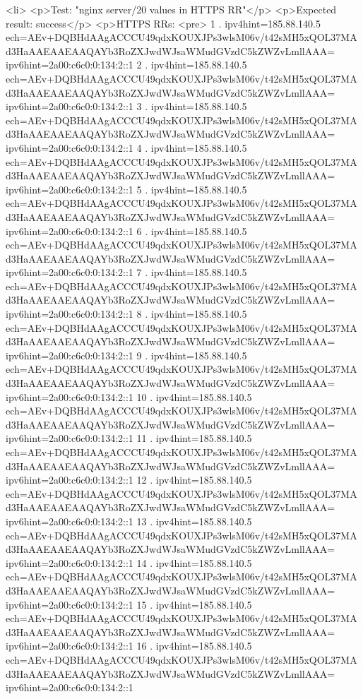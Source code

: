 <li>
<p>Test: "nginx server/20 values in HTTPS RR"</p>
<p>Expected result: success</p>
<p>HTTPS RRs: <pre>
1 . ipv4hint=185.88.140.5 ech=AEv+DQBHdAAgACCCU49qdxKOUXJPs3wlsM06v/t42sMH5xQOL37MAd3HaAAEAAEAAQAYb3RoZXJwdWJsaWMudGVzdC5kZWZvLmllAAA= ipv6hint=2a00:c6c0:0:134:2::1
2 . ipv4hint=185.88.140.5 ech=AEv+DQBHdAAgACCCU49qdxKOUXJPs3wlsM06v/t42sMH5xQOL37MAd3HaAAEAAEAAQAYb3RoZXJwdWJsaWMudGVzdC5kZWZvLmllAAA= ipv6hint=2a00:c6c0:0:134:2::1
3 . ipv4hint=185.88.140.5 ech=AEv+DQBHdAAgACCCU49qdxKOUXJPs3wlsM06v/t42sMH5xQOL37MAd3HaAAEAAEAAQAYb3RoZXJwdWJsaWMudGVzdC5kZWZvLmllAAA= ipv6hint=2a00:c6c0:0:134:2::1
4 . ipv4hint=185.88.140.5 ech=AEv+DQBHdAAgACCCU49qdxKOUXJPs3wlsM06v/t42sMH5xQOL37MAd3HaAAEAAEAAQAYb3RoZXJwdWJsaWMudGVzdC5kZWZvLmllAAA= ipv6hint=2a00:c6c0:0:134:2::1
5 . ipv4hint=185.88.140.5 ech=AEv+DQBHdAAgACCCU49qdxKOUXJPs3wlsM06v/t42sMH5xQOL37MAd3HaAAEAAEAAQAYb3RoZXJwdWJsaWMudGVzdC5kZWZvLmllAAA= ipv6hint=2a00:c6c0:0:134:2::1
6 . ipv4hint=185.88.140.5 ech=AEv+DQBHdAAgACCCU49qdxKOUXJPs3wlsM06v/t42sMH5xQOL37MAd3HaAAEAAEAAQAYb3RoZXJwdWJsaWMudGVzdC5kZWZvLmllAAA= ipv6hint=2a00:c6c0:0:134:2::1
7 . ipv4hint=185.88.140.5 ech=AEv+DQBHdAAgACCCU49qdxKOUXJPs3wlsM06v/t42sMH5xQOL37MAd3HaAAEAAEAAQAYb3RoZXJwdWJsaWMudGVzdC5kZWZvLmllAAA= ipv6hint=2a00:c6c0:0:134:2::1
8 . ipv4hint=185.88.140.5 ech=AEv+DQBHdAAgACCCU49qdxKOUXJPs3wlsM06v/t42sMH5xQOL37MAd3HaAAEAAEAAQAYb3RoZXJwdWJsaWMudGVzdC5kZWZvLmllAAA= ipv6hint=2a00:c6c0:0:134:2::1
9 . ipv4hint=185.88.140.5 ech=AEv+DQBHdAAgACCCU49qdxKOUXJPs3wlsM06v/t42sMH5xQOL37MAd3HaAAEAAEAAQAYb3RoZXJwdWJsaWMudGVzdC5kZWZvLmllAAA= ipv6hint=2a00:c6c0:0:134:2::1
10 . ipv4hint=185.88.140.5 ech=AEv+DQBHdAAgACCCU49qdxKOUXJPs3wlsM06v/t42sMH5xQOL37MAd3HaAAEAAEAAQAYb3RoZXJwdWJsaWMudGVzdC5kZWZvLmllAAA= ipv6hint=2a00:c6c0:0:134:2::1
11 . ipv4hint=185.88.140.5 ech=AEv+DQBHdAAgACCCU49qdxKOUXJPs3wlsM06v/t42sMH5xQOL37MAd3HaAAEAAEAAQAYb3RoZXJwdWJsaWMudGVzdC5kZWZvLmllAAA= ipv6hint=2a00:c6c0:0:134:2::1
12 . ipv4hint=185.88.140.5 ech=AEv+DQBHdAAgACCCU49qdxKOUXJPs3wlsM06v/t42sMH5xQOL37MAd3HaAAEAAEAAQAYb3RoZXJwdWJsaWMudGVzdC5kZWZvLmllAAA= ipv6hint=2a00:c6c0:0:134:2::1
13 . ipv4hint=185.88.140.5 ech=AEv+DQBHdAAgACCCU49qdxKOUXJPs3wlsM06v/t42sMH5xQOL37MAd3HaAAEAAEAAQAYb3RoZXJwdWJsaWMudGVzdC5kZWZvLmllAAA= ipv6hint=2a00:c6c0:0:134:2::1
14 . ipv4hint=185.88.140.5 ech=AEv+DQBHdAAgACCCU49qdxKOUXJPs3wlsM06v/t42sMH5xQOL37MAd3HaAAEAAEAAQAYb3RoZXJwdWJsaWMudGVzdC5kZWZvLmllAAA= ipv6hint=2a00:c6c0:0:134:2::1
15 . ipv4hint=185.88.140.5 ech=AEv+DQBHdAAgACCCU49qdxKOUXJPs3wlsM06v/t42sMH5xQOL37MAd3HaAAEAAEAAQAYb3RoZXJwdWJsaWMudGVzdC5kZWZvLmllAAA= ipv6hint=2a00:c6c0:0:134:2::1
16 . ipv4hint=185.88.140.5 ech=AEv+DQBHdAAgACCCU49qdxKOUXJPs3wlsM06v/t42sMH5xQOL37MAd3HaAAEAAEAAQAYb3RoZXJwdWJsaWMudGVzdC5kZWZvLmllAAA= ipv6hint=2a00:c6c0:0:134:2::1
